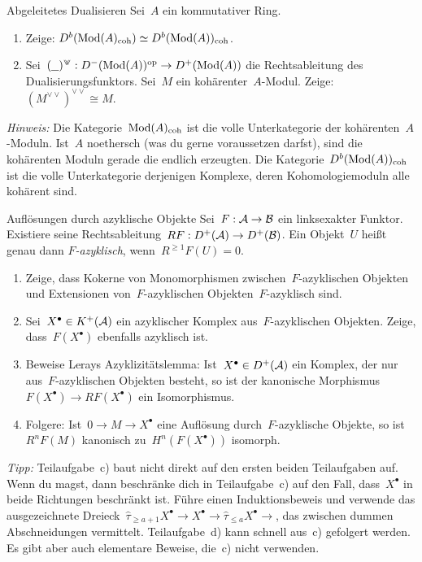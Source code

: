 \documentclass{uebblatt}
\newcommand{\dd}{{\vee\!\!\!\vee}}
\begin{document}

\begin{aufgabe}{Abgeleitetes Dualisieren}
Sei~$A$ ein kommutativer Ring.
\begin{enumerate}
\item Zeige: $D^b(\mathrm{Mod}(A)_\mathrm{coh}) \simeq D^b(\mathrm{Mod}(A))_\mathrm{coh}$.
\item Sei~$(\smallplaceholder)^\dd : D^-(\Mod(A))^\op \to D^+(\Mod(A))$ die
Rechtsableitung des Dualisierungsfunktors. Sei~$M$ ein kohärenter~$A$-Modul.
Zeige: $(M^\dd)^\dd \cong M$.
\end{enumerate}

{\tiny\emph{Hinweis:} Die Kategorie~$\mathrm{Mod}(A)_\mathrm{coh}$ ist die volle
Unterkategorie der kohärenten~$A$-Moduln. Ist~$A$ noethersch (was du gerne
voraussetzen darfst), sind die kohärenten Moduln gerade die endlich erzeugten.
Die Kategorie~$D^b(\mathrm{Mod}(A))_\mathrm{coh}$ ist die volle Unterkategorie
derjenigen Komplexe, deren Kohomologiemoduln alle kohärent sind.\par}
\end{aufgabe}

\begin{aufgabe}{Auflösungen durch azyklische Objekte}
Sei~$F : \mathcal{A} \to \mathcal{B}$ ein linksexakter Funktor. Existiere seine
Rechtsableitung~$RF : D^+(\mathcal{A}) \to D^+(\mathcal{B})$. Ein Objekt~$U$ heißt genau dann
\emph{$F$-azyklisch}, wenn~$R^{\geq 1}F(U) = 0$.
\begin{enumerate}
\item Zeige, dass Kokerne von Monomorphismen zwischen~$F$-azyklischen
Objekten und Extensionen von~$F$-azyklischen Objekten~$F$-azyklisch sind.
\item Sei~$X^\bullet \in K^+(\mathcal{A})$ ein azyklischer Komplex aus~$F$-azyklischen
Objekten. Zeige, dass~$F(X^\bullet)$ ebenfalls azyklisch ist.
\item Beweise Lerays Azyklizitätslemma: Ist~$X^\bullet \in D^+(\mathcal{A})$ ein Komplex, der nur
aus~$F$-azyklischen Objekten besteht, so ist der kanonische
Morphismus~$F(X^\bullet) \to RF(X^\bullet)$ ein Isomorphismus.
\item Folgere: Ist~$0 \to M \to X^\bullet$ eine Auflösung durch~$F$-azyklische
Objekte, so ist~$R^nF(M)$ kanonisch zu~$H^n(F(X^\bullet))$ isomorph.
\end{enumerate}

{\tiny\emph{Tipp:} Teilaufgabe~c) baut nicht direkt auf den ersten beiden
Teilaufgaben auf. Wenn du magst, dann beschränke dich in Teilaufgabe~c) auf den Fall,
dass~$X^\bullet$ in beide Richtungen beschränkt ist. Führe einen
Induktionsbeweis und verwende das ausgezeichnete Dreieck~$\hat\tau_{\geq a+1}
X^\bullet \to X^\bullet \to \hat\tau_{\leq a} X^\bullet \to$, das zwischen
dummen Abschneidungen vermittelt. Teilaufgabe~d) kann schnell aus~c) gefolgert
werden. Es gibt aber auch elementare Beweise, die~c) nicht verwenden.\par}
\end{aufgabe}
\end{document}
